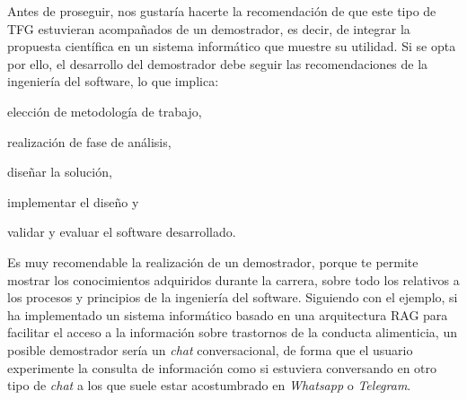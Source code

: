 Antes de proseguir, nos gustaría hacerte la recomendación de que este tipo de TFG estuvieran acompañados de un demostrador, es decir, de integrar la propuesta científica en un sistema informático que muestre su utilidad. Si se opta por ello, el desarrollo del demostrador debe seguir las recomendaciones de la ingeniería del software, lo que implica: \begin{enumerate*}[label=(\arabic*)]\item elección de metodología de trabajo, \item realización de fase de análisis, \item diseñar la solución, \item implementar el diseño y \item validar y evaluar el software desarrollado.\end{enumerate*} Es muy recomendable la realización de un demostrador, porque te permite mostrar los conocimientos adquiridos durante la carrera, sobre todo los relativos a los procesos y principios de la ingeniería del software. Siguiendo con el ejemplo, si ha implementado un sistema informático basado en una arquitectura RAG para facilitar el acceso a la información sobre trastornos de la conducta alimenticia, un posible demostrador sería un \textit{chat} conversacional, de forma que el usuario experimente la consulta de información como si estuviera conversando en otro tipo de \textit{chat} a los que suele estar acostumbrado en \textit{Whatsapp} o \textit{Telegram}.

